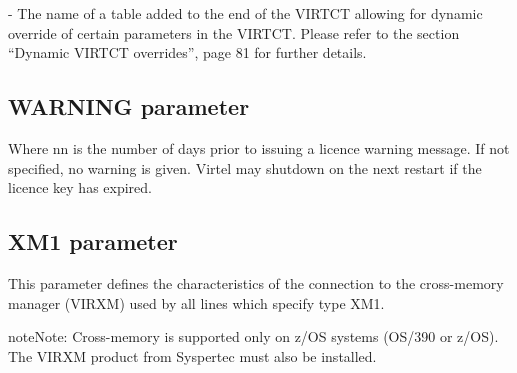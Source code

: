 \documentclass[letterpaper,10pt,english]{sphinxmanual}
\begin{document}
 - The name of a table added to the end of the VIRTCT allowing for dynamic override of certain parameters in the VIRTCT. Please refer to the section “Dynamic VIRTCT overrides”, page 81 for further details.

\ignorespaces 

\subsection{WARNING parameter}
\label{\detokenize{Installation_Guide:warning-parameter}}\label{\detokenize{Installation_Guide:index-140}}
\begin{sphinxVerbatim}[commandchars=\\\{\}]
\end{sphinxVerbatim}

Where nn is the number of days prior to issuing a licence warning message. If not specified, no warning is given. Virtel may shutdown on the next restart if the licence key has expired.

\ignorespaces 

\subsection{XM1 parameter}
\label{\detokenize{Installation_Guide:xm1-parameter}}\label{\detokenize{Installation_Guide:index-141}}
\begin{sphinxVerbatim}[commandchars=\\\{\}]
   
\PYG{p}{[}\PYG{p}{]}
\end{sphinxVerbatim}

This parameter defines the characteristics of the connection to the cross-memory manager (VIRXM) used by all lines which specify type XM1.

\begin{sphinxadmonition}{note}{Note:}
Cross-memory is supported only on z/OS systems (OS/390 or z/OS). The VIRXM product from Syspertec must also be installed.
\end{sphinxadmonition}
\end{document}
